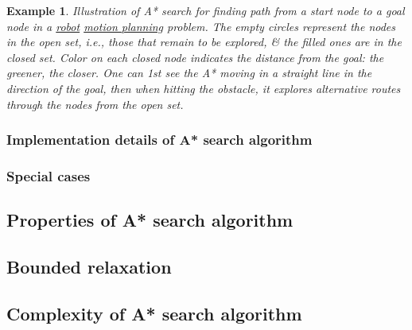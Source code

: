 \documentclass{article}
\newtheorem{example}{Example}
\begin{document}
\begin{example}
    Illustration of A* search for finding path from a start node to a goal node in a \href{https://en.wikipedia.org/wiki/Robotics}{robot} \href{https://en.wikipedia.org/wiki/Motion_planning}{motion planning} problem. The empty circles represent the nodes in the {\rm open} set, i.e., those that remain to be explored, \& the filled ones are in the closed set. Color on each closed node indicates the distance from the goal: the greener, the closer. One can 1st see the A* moving in a straight line in the direction of the goal, then when hitting the obstacle, it explores alternative routes through the nodes from the open set.
\end{example}


\subsubsection{Implementation details of A* search algorithm}


\subsubsection{Special cases}


\subsection{Properties of A* search algorithm}







\subsection{Bounded relaxation}


\subsection{Complexity of A* search algorithm}
\end{document}
